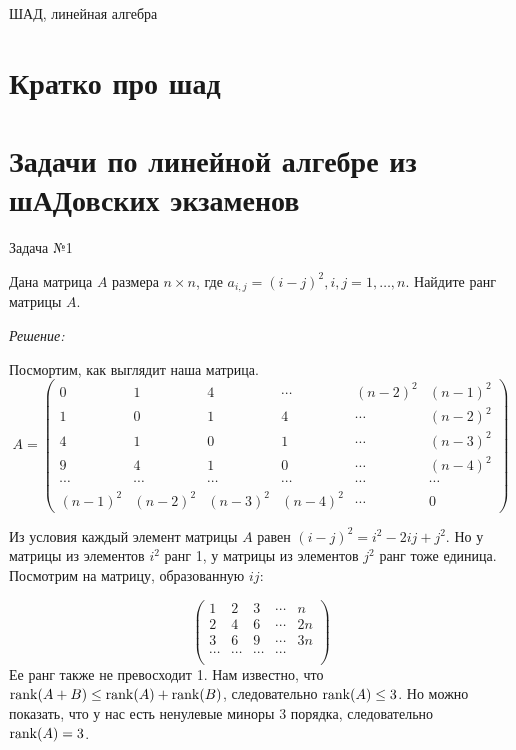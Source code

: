 \documentclass[10pt]{article}
\begin{document}


\DoFirstPageTechnicalStuff

\begin{abstract}
\end{abstract}

\begin{keyword}
ШАД, линейная алгебра
\end{keyword}

\section{Кратко про шад}


\section{Задачи по линейной алгебре из шАДовских экзаменов}

Задача №1

Дана матрица $A$ размера $n \times n$, где $a_{i,j} = (i-j)^2, i,j = 1,\ldots ,n$. Найдите ранг матрицы $A$.

\textit{Решение:}

Посмортим, как выглядит наша матрица.
\[
A = \begin{pmatrix}
0 & 1 & 4 & \cdots & (n-2)^2 & (n-1)^2 \\
1 & 0 & 1 & 4 & \cdots & (n-2)^2 \\
4 & 1 & 0 & 1 & \cdots & (n-3)^2 \\
9 & 4 & 1 & 0 & \cdots & (n-4)^2 \\
\cdots & \cdots & \cdots & \cdots & \cdots & \cdots \\
(n-1)^2 & (n-2)^2 & (n-3)^2 & (n-4)^2 & \cdots & 0
\end{pmatrix}
\]

Из условия каждый элемент матрицы $A$ равен $(i-j)^2 = i^2 - 2ij + j^2$. Но у матрицы из элементов $i^2$ ранг 1, у матрицы из элементов $j^2$ ранг тоже единица. Посмотрим на матрицу, образованную $ij$:

\[
\begin{pmatrix}
1 & 2 & 3 & \cdots & n \\
2 & 4 & 6 & \cdots & 2n \\
3 & 6 & 9 & \cdots & 3n \\
\cdots & \cdots & \cdots & \cdots \\
\end{pmatrix}
\]
Ее ранг также не превосходит 1. Нам известно, что $\operatorname{rank}(A + B) \leq \operatorname{rank}(A) + \operatorname{rank}(B)$, следовательно $\operatorname{rank}(A) \leq 3$. Но можно показать, что у нас есть ненулевые миноры 3 порядка, следовательно $\operatorname{rank}(A) = 3$.
\end{document}
